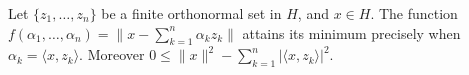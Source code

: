Let $\{z_1,\ldots,z_n\}$ be a finite orthonormal set in $H$, and $x \in H$. The function $f(\alpha_1,\ldots,\alpha_n) = \|x - \sum_{k=1}^{n} \alpha_k z_k\|$ attains its minimum precisely when $\alpha_k = \langle x, z_k \rangle$. Moreover $0 \leq \|x\|^2 - \sum_{k=1}^{n} |\langle x, z_k \rangle|^2$.
